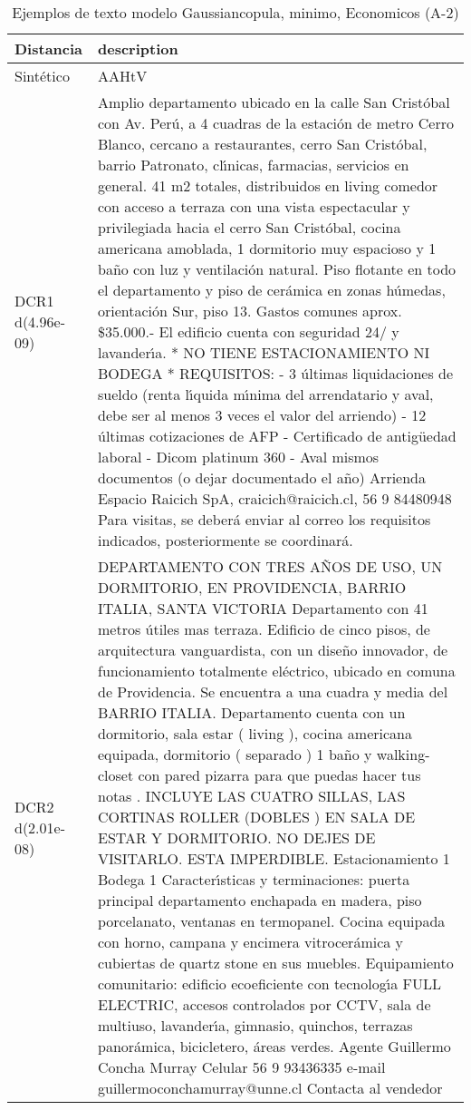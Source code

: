 \begin{table}[H]
\centering
\fontsize{10}{14}\selectfont
\caption{Ejemplos de texto modelo Gaussiancopula, minimo, Economicos (A-2)}
\label{table-example-economicos-a-2-gaussiancopula-min-text}
\begin{tabular}{|l|m{35em}|}
\hline
\rowcolor[gray]{0.8}
Distancia & description \\
\hline Sintético & AAHtV \\
\hline DCR1 d(4.96e-09) & Amplio departamento ubicado en la calle San Crist\'obal con Av. Per\'u, a 4 cuadras de la estaci\'on de metro Cerro Blanco, cercano a restaurantes, cerro San Crist\'obal, barrio Patronato, cl{\'\i}nicas, farmacias, servicios en general. 41 m2 totales, distribuidos en living comedor con acceso a terraza con una vista espectacular y privilegiada hacia el cerro San Crist\'obal, cocina americana amoblada, 1 dormitorio muy espacioso y 1 ba\~no con luz y ventilaci\'on natural. Piso flotante en todo el departamento y piso de cer\'amica en zonas h\'umedas, orientaci\'on Sur, piso 13. Gastos comunes aprox. \$35.000.- El edificio cuenta con seguridad 24/ y lavander{\'\i}a. * NO TIENE ESTACIONAMIENTO NI BODEGA  * REQUISITOS: - 3 \'ultimas liquidaciones de sueldo (renta l{\'\i}quida m{\'\i}nima del arrendatario y aval, debe ser al menos 3 veces el valor del arriendo) - 12 \'ultimas cotizaciones de AFP - Certificado de antig\"uedad laboral - Dicom platinum 360 - Aval mismos documentos (o dejar documentado el a\~no)  Arrienda Espacio Raicich SpA, craicich@raicich.cl, 56 9 84480948 Para visitas, se deber\'a enviar al correo los requisitos indicados, posteriormente se coordinar\'a. \\
\hline DCR2 d(2.01e-08) & DEPARTAMENTO CON TRES A\~NOS DE USO, UN DORMITORIO, EN PROVIDENCIA, BARRIO ITALIA, SANTA VICTORIA  Departamento con 41 metros \'utiles mas terraza. Edificio de cinco pisos, de arquitectura vanguardista, con un dise\~no innovador, de funcionamiento totalmente el\'ectrico, ubicado en comuna de Providencia. Se encuentra a una cuadra y media del BARRIO ITALIA. Departamento cuenta con un dormitorio, sala estar ( living ), cocina americana equipada, dormitorio ( separado ) 1 ba\~no y walking-closet con pared pizarra para que puedas hacer tus notas . INCLUYE LAS CUATRO SILLAS, LAS CORTINAS ROLLER (DOBLES ) EN SALA DE ESTAR Y DORMITORIO. NO DEJES DE VISITARLO. ESTA IMPERDIBLE.   Estacionamiento 1 Bodega 1  Caracter{\'\i}sticas y terminaciones: puerta principal departamento enchapada en madera, piso porcelanato, ventanas en termopanel. Cocina equipada con horno, campana y encimera vitrocer\'amica y cubiertas de quartz stone en sus muebles.  Equipamiento comunitario: edificio ecoeficiente con tecnolog{\'\i}a FULL ELECTRIC, accesos controlados por CCTV, sala de multiuso, lavander{\'\i}a, gimnasio, quinchos, terrazas panor\'amica, bicicletero, \'areas verdes.   Agente Guillermo Concha Murray Celular 56 9 93436335 e-mail guillermoconchamurray@unne.cl Contacta al vendedor \\
\hline
\end{tabular}
\end{table}
